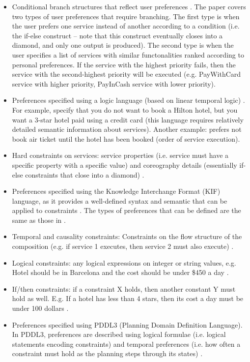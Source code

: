 \begin{itemize}
 \item Conditional branch structures that reflect user preferences \cite{wang2014automated}. The paper covers two types of user preferences that require branching. The first type is when the user prefers one service instead of another according to a condition (i.e. the if-else construct -- note that this construct eventually closes into a diamond, and only one output is produced). The second type is when the user specifies a list of services with similar functonalities ranked according to personal preferences. If the service with the highest priority fails, then the service with the second-highest priority will be executed (e.g. PayWithCard service with higher priority, PayInCash service with lower priority).
 \item Preferences specified using a logic language (based on linear temporal logic) \cite{sohrabi2009web}. For example, specify that you do not want to book a Hilton hotel, but you want a 3-star hotel paid using a credit card (this language requires relatively detailed semantic information about services). Another example: prefers not book air ticket until the hotel has been booked (order of service execution).
 \item Hard constraints on services: service properties (i.e. service must have a specific property with a specific value) and coreography details (essentially if-else constraints that close into a diamond) \cite{boustil2010web}.
 \item Preferences specified using the Knowledge Interchange Format (KIF) language, as it provides a well-defined syntax and semantic that can be applied to constraints \cite{gamha2008framework}. The types of preferences that can be defined are the same as those in \cite{sohrabi2009web}.
 \item Temporal and causality constraints: Constraints on the flow structure of the composition (e.g. if service 1 executes, then service 2 must also execute) \cite{karakoc2009composing}.
 \item Logical constraints: any logical expressions on integer or string values, e.g. Hotel should be in Barcelona and the cost should be under \$450 a day \cite{karakoc2009composing}.
 \item If/then constraints: if a constraint X holds, then another constant Y must hold as well. E.g. If a hotel has less than 4 stars, then its cost a day must be under 100 dollars \cite{karakoc2009composing}.
 \item Preferences specified using PDDL3 (Planning Domain Definition Language). In PDDL3, preferences are described using logical formulae (i.e. logical statements encoding constraints) and temporal preferences (i.e. how often a constraint must hold as the planning steps through its states) \cite{lin2008web}.

\end{itemize}
